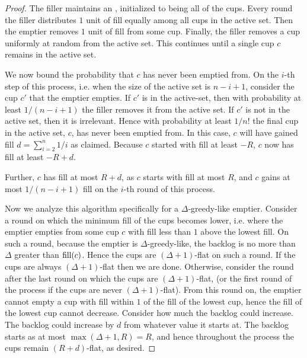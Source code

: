 \begin{proof}
  The filler maintains an , initialized to being
  all of the cups. Every round the filler distributes $1$ unit of
  fill equally among all cups in the active set. Then the emptier
  removes $1$ unit of fill from some cup. Finally, the filler
  removes a cup uniformly at random from the active set. This
  continues until a single cup $c$ remains in the active set. 

  We now bound the probability that $c$ has never been emptied
  from. On the $i$-th step of this process, i.e. when the size of
  the active set is $n-i+1$, consider the cup $c'$ that the
  emptier empties. If $c'$ is in the active-set, then with
  probability at least $1/(n-i+1)$ the filler removes it from the
  active set. If $c'$ is not in the active set, then it is
  irrelevant. Hence with probability at least $1/n!$ the final
  cup in the active set, $c$, has never been emptied from. In
  this case, $c$ will have gained fill $d=\sum_{i=2}^n 1/i$ as
  claimed. Because $c$ started with fill at least $-R$, $c$ now
  has fill at least $-R+ d$. 

  Further, $c$ has fill at most $R + d$, as $c$ starts with fill
  at most $R$, and $c$ gains at most $1/(n-i+1)$ fill on the
  $i$-th round of this process.

  Now we analyze this algorithm specifically for a
  $\Delta$-greedy-like emptier. Consider a round on which the
  minimum fill of the cups becomes lower, i.e. where the emptier
  empties from some cup $c$ with fill less than $1$ above the
  lowest fill. On such a round, because the emptier is
  $\Delta$-greedy-like, the backlog is no more than $\Delta$
  greater than $\operatorname{\textnormal{fill}}(c)$. Hence the cups are $(\Delta+1)$-flat on
  such a round. If the cups are always $(\Delta+1)$-flat then we
  are done. Otherwise, consider the round after the last round on
  which the cups are $(\Delta + 1)$-flat, (or the first round of
  the process if the cups are never $(\Delta+1)$-flat). From this
  round on, the emptier cannot empty a cup with fill within $1$
  of the fill of the lowest cup, hence the fill of the lowest cup
  cannot decrease. Consider how much the backlog could increase.
  The backlog could increase by $d$ from whatever value it starts
  at. The backlog starts as at most $\max(\Delta+1, R) = R$, and
  hence throughout the process the cups remain $(R+d)$-flat, as
  desired.

\end{proof}


